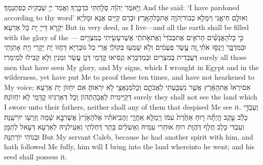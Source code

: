 {וַיֹּ֣אמֶר יְהֹוָ֔ה סָלַ֖חְתִּי כִּדְבָרֶֽךָ׃}
{וַאֲמַר יְיָ שְׁבַקִית כְּפִתְגָמָךְ׃}
{And the \lord\space said: ‘I have pardoned according to thy word’}{}
{וְאוּלָ֖ם חַי\maqqaf אָ֑נִי וְיִמָּלֵ֥א כְבוֹד\maqqaf יְהֹוָ֖ה אֶת\maqqaf כׇּל\maqqaf הָאָֽרֶץ׃}
{וּבְרַם קַיָּים אֲנָא וּמָלְיָא יְקָרָא דַּייָ יָת כָּל אַרְעָא׃}
{But in very deed, as I live—and all the earth shall be filled with the glory of the \lord—}{}
{כִּ֣י כׇל\maqqaf הָאֲנָשִׁ֗ים הָרֹאִ֤ים אֶת\maqqaf כְּבֹדִי֙ וְאֶת\maqqaf אֹ֣תֹתַ֔י אֲשֶׁר\maqqaf עָשִׂ֥יתִי בְמִצְרַ֖יִם וּבַמִּדְבָּ֑ר וַיְנַסּ֣וּ אֹתִ֗י זֶ֚ה עֶ֣שֶׂר פְּעָמִ֔ים וְלֹ֥א שָׁמְע֖וּ בְּקוֹלִֽי׃}
{אֲרֵי כְל גּוּבְרַיָּא דַּחֲזוֹ יָת יְקָרִי וְיָת אָתְוָתַי דַּעֲבַדִית בְּמִצְרַיִם וּבְמַדְבְּרָא וְנַסִּיאוּ קֳדָמַי דְּנָן עֲשַׂר זִמְנִין וְלָא קַבִּילוּ לְמֵימְרִי׃}
{surely all those men that have seen My glory, and My signs, which I wrought in Egypt and in the wilderness, yet have put Me to proof these ten times, and have not hearkened to My voice;}{}
{אִם\maqqaf יִרְאוּ֙ אֶת\maqqaf הָאָ֔רֶץ אֲשֶׁ֥ר נִשְׁבַּ֖עְתִּי לַאֲבֹתָ֑ם וְכׇל\maqqaf מְנַאֲצַ֖י לֹ֥א יִרְאֽוּהָ׃}
{אִם יִחְזוֹן יָת אַרְעָא דְּקַיֵּימִית לַאֲבָהָתְהוֹן וְכָל דְּאַרְגִּיזוּ קֳדָמַי לָא יִחְזוֹנַהּ׃}
{surely they shall not see the land which I swore unto their fathers, neither shall any of them that despised Me see it.}{}
{וְעַבְדִּ֣י כָלֵ֗ב עֵ֣קֶב הָֽיְתָ֞ה ר֤וּחַ אַחֶ֙רֶת֙ עִמּ֔וֹ וַיְמַלֵּ֖א אַחֲרָ֑י וַהֲבִֽיאֹתִ֗יו אֶל\maqqaf הָאָ֙רֶץ֙ אֲשֶׁר\maqqaf בָּ֣א שָׁ֔מָּה וְזַרְע֖וֹ יוֹרִשֶֽׁנָּה׃}
{וְעַבְדִּי כָלֵב חֲלָף דַּהֲוָת רוּחַ אוּחְרִי עִמֵּיהּ וְאַשְׁלֵים בָּתַר דַּחְלְתִי וְאַעֵילִנֵּיהּ לְאַרְעָא דְּעָאל לְתַמָּן וּבְנוֹהִי יוֹרְתִנַּהּ}
{But My servant Caleb, because he had another spirit with him, and hath followed Me fully, him will I bring into the land whereinto he went; and his seed shall possess it.}{}
